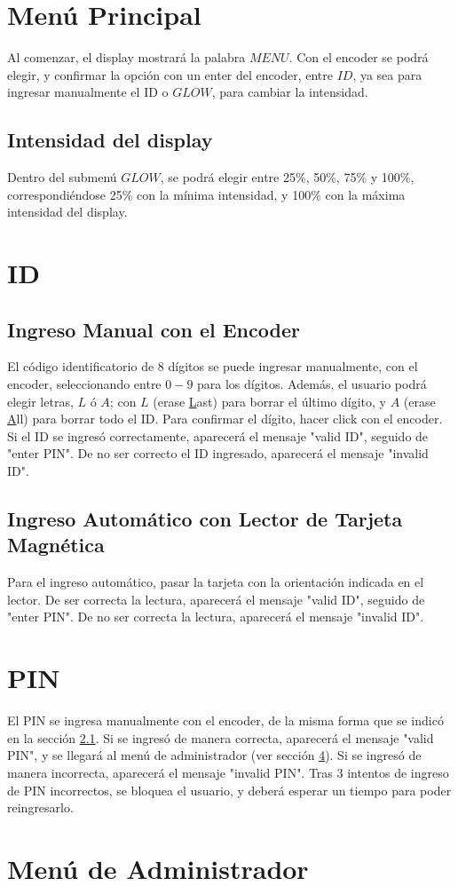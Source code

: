 \section{Menú Principal}

Al comenzar, el display mostrará la palabra $MENU$. 
Con el encoder se podrá elegir, y confirmar la opción con un enter del encoder, entre $ID$, 
ya sea para ingresar manualmente el ID o $GLOW$, para cambiar la intensidad.

\subsection{Intensidad del display}

Dentro del submenú $GLOW$, se podrá elegir entre 25\%, 50\%, 75\% y 100\%, 
correspondiéndose 25\% con la mínima intensidad, y 100\% con la máxima intensidad del display.

\section{ID}
\subsection{Ingreso Manual con el Encoder}
\label{pinsection}
El código identificatorio de 8 dígitos se puede ingresar manualmente, con el encoder, 
seleccionando entre $0-9$ para los dígitos. Además, el usuario podrá elegir letras, $L$ ó $A$;
con $L$ (erase \underline{L}ast) para borrar el último dígito, y $A$ (erase \underline{A}ll)
 para borrar todo el ID.
 Para confirmar el dígito, hacer click con el encoder.
 Si el ID se ingresó correctamente, aparecerá el mensaje "valid ID", seguido de "enter PIN".
 De no ser correcto el ID ingresado, aparecerá el mensaje "invalid ID".

 \subsection{Ingreso Automático con Lector de Tarjeta Magnética}
 Para el ingreso automático, pasar la tarjeta con la orientación indicada en el lector.
 De ser correcta la lectura, aparecerá el mensaje "valid ID", seguido de "enter PIN".
 De no ser correcta la lectura, aparecerá el mensaje "invalid ID".

 \section{PIN}
 El PIN se ingresa manualmente con el encoder, de la misma forma 
 que se indicó en la sección \ref{pinsection}.
 Si se ingresó de manera correcta, aparecerá el mensaje "valid PIN", 
 y se llegará al menú de administrador (ver sección \ref{adminmenu}).
Si se ingresó de manera incorrecta, aparecerá el mensaje "invalid PIN".
Tras 3 intentos de ingreso de PIN incorrectos, se bloquea el usuario, 
y deberá esperar un tiempo para poder reingresarlo.


 \section{Menú de Administrador}
 \label{adminmenu}
 



